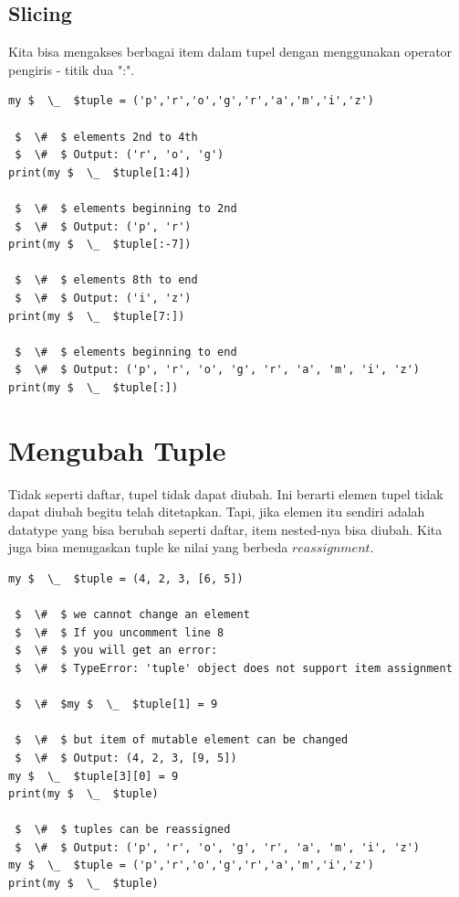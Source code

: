 \subsection{Slicing} 
Kita bisa mengakses berbagai item dalam tupel dengan menggunakan operator pengiris - titik dua ":". 
\begin{verbatim}
my $  \_  $tuple = ('p','r','o','g','r','a','m','i','z') 

 $  \#  $ elements 2nd to 4th 
 $  \#  $ Output: ('r', 'o', 'g') 
print(my $  \_  $tuple[1:4]) 

 $  \#  $ elements beginning to 2nd 
 $  \#  $ Output: ('p', 'r') 
print(my $  \_  $tuple[:-7]) 

 $  \#  $ elements 8th to end 
 $  \#  $ Output: ('i', 'z') 
print(my $  \_  $tuple[7:]) 

 $  \#  $ elements beginning to end 
 $  \#  $ Output: ('p', 'r', 'o', 'g', 'r', 'a', 'm', 'i', 'z') 
print(my $  \_  $tuple[:]) 
\end{verbatim}
\section{Mengubah Tuple} 
Tidak seperti daftar, tupel tidak dapat diubah. Ini berarti elemen tupel tidak dapat diubah begitu telah ditetapkan. Tapi, jika elemen itu sendiri adalah datatype yang bisa berubah seperti daftar, item nested-nya bisa diubah. Kita juga bisa menugaskan tuple ke nilai yang berbeda \(reassignment\). 
\begin{verbatim}
my $  \_  $tuple = (4, 2, 3, [6, 5]) 

 $  \#  $ we cannot change an element 
 $  \#  $ If you uncomment line 8 
 $  \#  $ you will get an error: 
 $  \#  $ TypeError: 'tuple' object does not support item assignment 

 $  \#  $my $  \_  $tuple[1] = 9 

 $  \#  $ but item of mutable element can be changed 
 $  \#  $ Output: (4, 2, 3, [9, 5]) 
my $  \_  $tuple[3][0] = 9 
print(my $  \_  $tuple) 

 $  \#  $ tuples can be reassigned 
 $  \#  $ Output: ('p', 'r', 'o', 'g', 'r', 'a', 'm', 'i', 'z') 
my $  \_  $tuple = ('p','r','o','g','r','a','m','i','z') 
print(my $  \_  $tuple) 
\end{verbatim}
